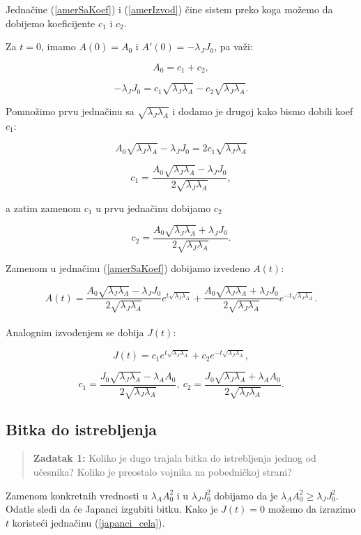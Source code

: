 \documentclass{article}
\newcommand{\laj}{\sqrt{\lambda_J\lambda_A}}
\begin{document}
Jednačine (\ref{amerSaKoef}) i (\ref{amerIzvod}) čine sistem preko koga možemo
da dobijemo koeficijente \(c_1\) i \(c_2\). 

Za \(t = 0\), imamo  \(A(0) = A_0\) i
\(A'(0) = -\lambda_{J}J_0\), pa važi:

\[
  A_0 = c_1 + c_2,
\]

\[
  -\lambda_{J}J_0 = c_1 \laj - c_2 \laj.
\]

Pomnožimo prvu jednačinu sa \( \laj \) i dodamo je
drugoj kako bismo dobili koef \( c_1 \):

\[
  A_0 \laj - \lambda_{J}J_0 = 2 c_1 \laj
\]

\[
  c_1 = \frac{A_0 \laj - \lambda_J J_0}{2\laj },
\]

a zatim zamenom \(c_1\) u prvu jednačinu dobijamo \(c_2\)

\[
  c_2 = \frac{A_0 \laj + \lambda_J J_0}{2\laj }.
\]

Zamenom u jednačinu (\ref{amerSaKoef}) dobijamo izvedeno \(A(t)\):

\begin{equation}\label{ameri_cela}
  A(t) = \frac{A_0 \laj - \lambda_J J_0}{2 \laj } e^{t \laj } + \frac{A_0 \laj +
\lambda_J J_0}{2 \laj } e^{-t \laj}.
\end{equation}
\\
Analognim izvođenjem se dobija \(J(t)\):

\begin{equation}\label{japanci_cela}
  J(t) = c_1 e^{t \laj} + c_2 e^{-t \laj},
\end{equation}

\[
 c_1 = \frac{J_0 \laj- \lambda_A A_0}{2\laj},\ 
 c_2 = \frac{J_0 \laj+ \lambda_A A_0}{2 \laj}.
\]


\newpage

\subsection{Bitka do istrebljenja}

\vspace{5mm}
\begin{quote}
\textbf{Zadatak 1:}
Koliko je dugo trajala bitka do istrebljenja jednog od
učesnika? Koliko je preostalo vojnika na pobedničkoj
strani?
\end{quote}


\hspace{5mm}
Zamenom konkretnih vrednosti u \(\lambda_{A}A_0^2\) i u \(\lambda_{J}J_0^2\)
dobijamo da je \(\lambda_{A}A_0^2 \geq \lambda_{J}J_0^2\). Odatle sledi da će
Japanci izgubiti bitku.
Kako je \(J(t) = 0\) možemo da izrazimo \(t\) koristeći jednačinu
(\ref{japanci_cela}).
\end{document}
